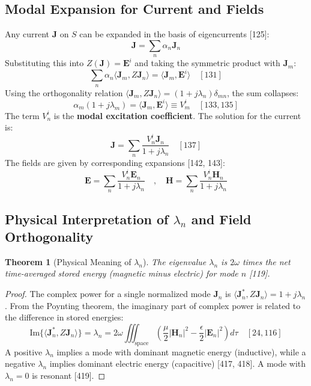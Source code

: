 \documentclass[11pt]{article}
\newcommand{\vect}[1]{\mathbf{#1}}
\newcommand{\sprod}[2]{\langle #1, #2 \rangle}
\newtheorem{theorem}{Theorem}[section]
\theoremstyle{definition}
\begin{document}
\subsection{Modal Expansion for Current and Fields}
Any current $\vect{J}$ on $S$ can be expanded in the basis of eigencurrents [125]:
\begin{equation}
\vect{J} = \sum_n \alpha_n \vect{J}_n
\end{equation}
Substituting this into $Z(\vect{J}) = \vect{E}^i$ and taking the symmetric product with $\vect{J}_m$:
\[ \sum_n \alpha_n \sprod{\vect{J}_m}{Z\vect{J}_n} = \sprod{\vect{J}_m}{\vect{E}^i} \quad [131] \]
Using the orthogonality relation $\sprod{\vect{J}_m}{Z\vect{J}_n}=(1+j\lambda_n)\delta_{mn}$, the sum collapses:
\[ \alpha_m (1+j\lambda_m) = \sprod{\vect{J}_m}{\vect{E}^i} \equiv V_m^i \quad [133, 135] \]
The term $V_n^i$ is the \textbf{modal excitation coefficient}. The solution for the current is:
\begin{equation}
\vect{J} = \sum_n \frac{V_n^i \vect{J}_n}{1+j\lambda_n} \quad [137]
\end{equation}
The fields are given by corresponding expansions [142, 143]:
\begin{equation}
\vect{E} = \sum_n \frac{V_n^i \vect{E}_n}{1+j\lambda_n} \quad , \quad \vect{H} = \sum_n \frac{V_n^i \vect{H}_n}{1+j\lambda_n}
\end{equation}

\subsection{Physical Interpretation of $\lambda_n$ and Field Orthogonality}

\begin{theorem}[Physical Meaning of $\lambda_n$]
The eigenvalue $\lambda_n$ is $2\omega$ times the net time-averaged stored energy (magnetic minus electric) for mode $n$ [119].
\end{theorem}
\begin{proof}
The complex power for a single normalized mode $\vect{J}_n$ is $\sprod{\vect{J}_n^*}{Z\mathbf{J}_n} = 1 + j\lambda_n$. From the Poynting theorem, the imaginary part of complex power is related to the difference in stored energies:
\[ \text{Im}\{\sprod{\vect{J}_n^*}{Z\mathbf{J}_n}\} = \lambda_n = 2\omega \iiint_{\text{space}} \left( \frac{\mu}{2}|\vect{H}_n|^2 - \frac{\epsilon}{2}|\vect{E}_n|^2 \right) d\tau \quad [24, 116] \]
A positive $\lambda_n$ implies a mode with dominant magnetic energy (inductive), while a negative $\lambda_n$ implies dominant electric energy (capacitive) [417, 418]. A mode with $\lambda_n = 0$ is resonant [419].
\end{proof}
\end{document}
